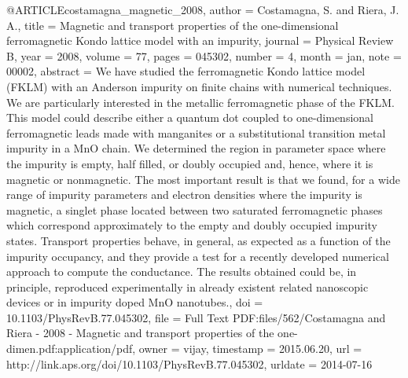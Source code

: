 @ARTICLE{costamagna_magnetic_2008,
  author = {Costamagna, S. and Riera, J. A.},
  title = {Magnetic and transport properties of the one-dimensional ferromagnetic
	{Kondo} lattice model with an impurity},
  journal = {Physical Review B},
  year = {2008},
  volume = {77},
  pages = {045302},
  number = {4},
  month = jan,
  note = {00002},
  abstract = {We have studied the ferromagnetic Kondo lattice model (FKLM) with
	an Anderson impurity on finite chains with numerical techniques.
	We are particularly interested in the metallic ferromagnetic phase
	of the FKLM. This model could describe either a quantum dot coupled
	to one-dimensional ferromagnetic leads made with manganites or a
	substitutional transition metal impurity in a MnO chain. We determined
	the region in parameter space where the impurity is empty, half filled,
	or doubly occupied and, hence, where it is magnetic or nonmagnetic.
	The most important result is that we found, for a wide range of impurity
	parameters and electron densities where the impurity is magnetic,
	a singlet phase located between two saturated ferromagnetic phases
	which correspond approximately to the empty and doubly occupied impurity
	states. Transport properties behave, in general, as expected as a
	function of the impurity occupancy, and they provide a test for a
	recently developed numerical approach to compute the conductance.
	The results obtained could be, in principle, reproduced experimentally
	in already existent related nanoscopic devices or in impurity doped
	MnO nanotubes.},
  doi = {10.1103/PhysRevB.77.045302},
  file = {Full Text PDF:files/562/Costamagna and Riera - 2008 - Magnetic and transport properties of the one-dimen.pdf:application/pdf},
  owner = {vijay},
  timestamp = {2015.06.20},
  url = {http://link.aps.org/doi/10.1103/PhysRevB.77.045302},
  urldate = {2014-07-16}
}

